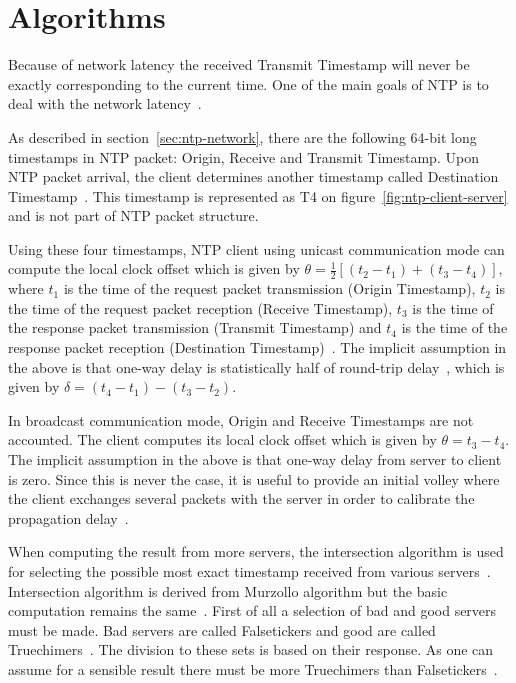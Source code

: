 
\section{Algorithms}\label{sec:ntp-algorithms}
Because of network latency the received Transmit Timestamp will never be exactly
corresponding to the current time.
One of the main goals of NTP is to deal with the network latency~\cite{ntp-overview}.

As described in section~\ref{sec:ntp-network},
there are the following 64-bit long timestamps in NTP packet: Origin, Receive and Transmit Timestamp.
Upon NTP packet arrival, the client determines another timestamp called
Destination Timestamp~\cite{rfc5905}.
This timestamp is represented as T4 on figure~\ref{fig:ntp-client-server}
and is not part of NTP packet structure.

Using these four timestamps, NTP client using unicast communication mode can compute
the local clock offset which is given by $\theta = \frac{1}{2}[(t_2 - t_1) + (t_3 - t_4)]$,
where $t_1$ is the time of the request packet transmission (Origin Timestamp),
$t_2$ is the time of the request packet reception (Receive Timestamp),
$t_3$ is the time of the response packet transmission (Transmit Timestamp) and
$t_4$ is the time of the response packet reception (Destination Timestamp)~\cite{ntp-algor,rfc5905}.
The implicit assumption in the above is that one-way delay is
statistically half of round-trip delay~\cite{rfc5905},
which is given by $\delta = (t_4 - t_1) - (t_3 - t_2)$.

In broadcast communication mode, Origin and Receive Timestamps are not accounted.
The client computes its local clock offset which is given by $\theta = t_3 - t_4$.
The implicit assumption in the above is that one-way delay from server to client is zero.
Since this is never the case, it is useful to provide an
initial volley where the client exchanges several packets with the server in
order to calibrate the propagation delay~\cite{rfc5905}.

When computing the result from more servers, the intersection algorithm is used
for selecting the possible most exact timestamp received from various servers~\cite{ntp-improved-algor,rfc5905}.
Intersection algorithm is derived from Murzollo algorithm but the basic
computation remains the same~\cite{ntp-history}.
First of all a selection of bad and good servers must be made.
Bad servers are called Falsetickers and good are called Truechimers~\cite{rfc5905}.
The division to these sets is based on their response.
As one can assume for a sensible result there must be more Truechimers than Falsetickers~\cite{rfc5905}.

